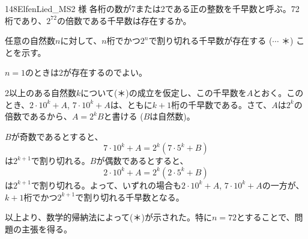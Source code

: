 \begin{prob}{148}{}{ElfenLied\_MS2 様}
 各桁の数が7または2である正の整数を千早数と呼ぶ。72桁であり、$2^{72}$の倍数である千早数は存在するか。
\end{prob}

任意の自然数$n$に対して、$n$桁でかつ$2^n$で割り切れる千早数が存在する ($\cdots$ ＊) ことを示す。

$n=1$のときは2が存在するのでよい。

2以上のある自然数$k$について(＊)の成立を仮定し、この千早数を$A$とおく。このとき、$2\cdot 10^k+A$, $7\cdot 10^k+A$は、ともに$k+1$桁の千早数である。さて、$A$は$2^k$の倍数であるから、$A=2^kB$と書ける ($B$は自然数)。

$B$が奇数であるとすると、
\[ 7\cdot 10^k+A=2^k(7\cdot 5^k+B) \]
は$2^{k+1}$で割り切れる。$B$が偶数であるとすると、
\[ 2\cdot 10^k+A=2^k(2\cdot 5^k+B) \]
は$2^{k+1}$で割り切れる。よって、いずれの場合も$2\cdot10^k+A$, $7\cdot 10^k+A$の一方が、$k+1$桁でかつ$2^{k+1}$で割り切れる千早数となる。

以上より、数学的帰納法によって(＊)が示された。特に$n=72$とすることで、問題の主張を得る。